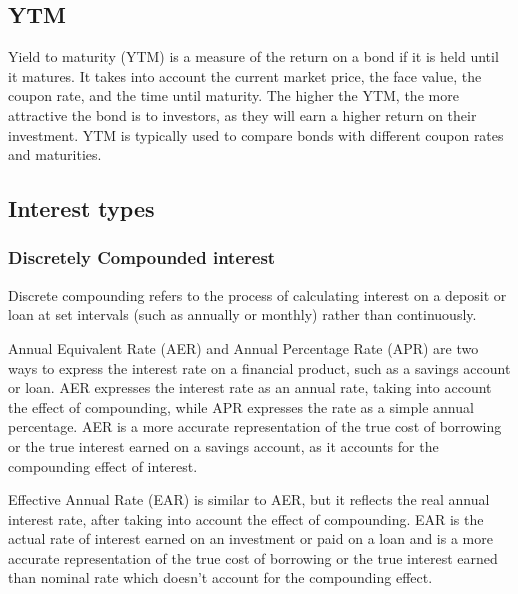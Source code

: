 \documentclass{article}
\theoremstyle{mytheoremstyle}
\theoremstyle{mytheoremstyle}
\theoremstyle{myproblemstyle}
\begin{document}
\subsection{YTM}
\begin{definition}
	Yield to maturity (YTM) is a measure of the return on a bond if it is held until it matures. It takes into account the current market price, the face value, the coupon rate, and the time until maturity. The higher the YTM, the more attractive the bond is to investors, as they will earn a higher return on their investment. YTM is typically used to compare bonds with different coupon rates and maturities.

\end{definition}

\subsection{Interest types}
\subsubsection{Discretely Compounded interest}

\begin{definition}
	Discrete compounding refers to the process of calculating interest on a deposit or loan at set intervals (such as annually or monthly) rather than continuously.
\end{definition}

\begin{definition}[APR]

	Annual Equivalent Rate (AER) and Annual Percentage Rate (APR) are two ways to express the interest rate on a financial product, such as a savings account or loan. AER expresses the interest rate as an annual rate, taking into account the effect of compounding, while APR expresses the rate as a simple annual percentage. AER is a more accurate representation of the true cost of borrowing or the true interest earned on a savings account, as it accounts for the compounding effect of interest.

\end{definition}

\begin{definition}

	Effective Annual Rate (EAR) is similar to AER, but it reflects the real annual interest rate, after taking into account the effect of compounding. EAR is the actual rate of interest earned on an investment or paid on a loan and is a more accurate representation of the true cost of borrowing or the true interest earned than nominal rate which doesn't account for the compounding effect.


\end{definition}
\end{document}
